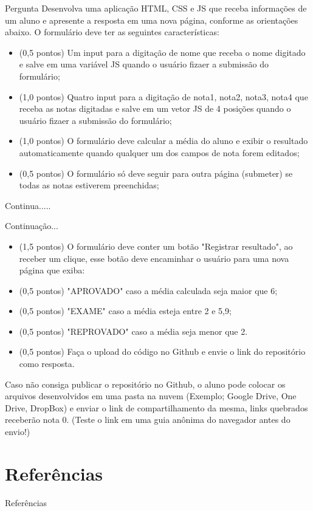 \documentclass{beamer}
\begin{document}
\begin{frame}{Pergunta}
\small
Desenvolva uma aplicação HTML, CSS e JS que receba informações de um aluno e apresente a resposta em uma nova página, conforme as orientações  abaixo. O formulário deve ter as seguintes características:
    \begin{itemize}
        \item (0,5 pontos) Um input para a digitação de nome que receba o nome digitado e salve em uma variável JS quando o usuário fizaer a submissão do formulário;
        \item (1,0 pontos) Quatro input para a digitação de nota1, nota2, nota3, nota4 que receba as notas digitadas e salve em um vetor JS  de 4 posições quando o usuário fizaer a submissão do formulário;
        \item (1,0 pontos)  O formulário deve calcular a média do aluno e exibir o resultado automaticamente quando qualquer um dos campos de nota forem editados;
        \item (0,5 pontos) O formulário só deve seguir para outra página (submeter) se todas as notas estiverem preenchidas;
        
    \end{itemize}
    Continua..... 
\end{frame}
\begin{frame}{Continuação...}
\small
\begin{itemize}
    \item (1,5 pontos) O formulário deve conter um botão "Registrar resultado", ao receber um clique, esse botão deve encaminhar o usuário para uma nova página que exiba:
        \item (0,5 pontos) "APROVADO" caso a média calculada seja maior que 6;
        \item (0,5 pontos) "EXAME" caso a média esteja entre 2 e 5,9;
        \item (0,5 pontos) "REPROVADO" caso a média seja menor que 2.
        \item (0,5 pontos) Faça o upload do código no Github e envie o link do repositório como resposta.
\end{itemize}
Caso não consiga publicar o repositório no Github, o aluno pode colocar os arquivos desenvolvidos em uma pasta na nuvem (Exemplo; Google Drive, One Drive, DropBox) e enviar o link de compartilhamento da mesma, links quebrados receberão nota 0. (Teste o link em uma guia anônima do navegador antes do envio!)
\end{frame}
\section{Referências}

\begin{frame}{Referências}%
\small
\begin{center}
\tiny


\end{center}
\end{frame}
\end{document}
